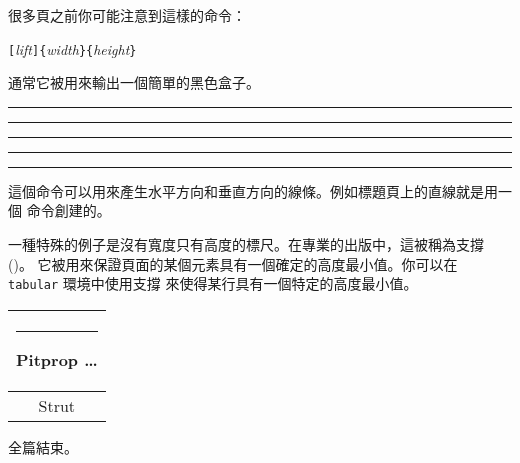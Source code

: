 很多頁之前你可能注意到這樣的命令：
\begin{lscommand}
\verb|[|\emph{lift}\verb|]{|\emph{width}\verb|}{|\emph{height}\verb|}|
\end{lscommand}

\noindent 通常它被用來輸出一個簡單的黑色盒子。

\begin{example}
\rule{3mm}{.1pt}%
\rule[-1mm]{5mm}{1cm}%
\rule{3mm}{.1pt}%
\rule[1mm]{1cm}{5mm}%
\rule{3mm}{.1pt}
\end{example}

\noindent 這個命令可以用來產生水平方向和垂直方向的線條。例如標題頁上的直線就是用一個  命令創建的。

一種特殊的例子是沒有寬度只有高度的標尺。在專業的出版中，這被稱為支撐 ()。
它被用來保證頁面的某個元素具有一個確定的高度最小值。你可以在 \texttt{tabular} 環境中使用支撐
來使得某行具有一個特定的高度最小值。

\begin{example}
\begin{tabular}{|c|}
\hline
\rule{1pt}{4ex}Pitprop \ldots\\
\hline
\rule{0pt}{4ex}Strut\\
\hline
\end{tabular}
\end{example}

\bigskip
{\flushright 全篇結束。\par}
%


